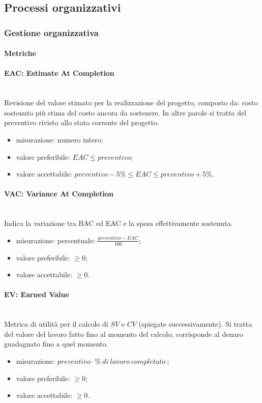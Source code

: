 \subsection{Processi organizzativi}
	\subsubsection{Gestione organizzativa}
\paragraph{Metriche}			
\paragraph*{EAC: Estimate At Completion}\mbox{}\\
Revisione del valore stimato per la realizzazione del progetto, composto da: costo sostenuto più stima del costo ancora da sostenere. In altre parole si tratta del preventivo rivisto allo stato corrente del progetto.
\begin{itemize}
	\item  misurazione: numero intero;
	\item  valore preferibile: $ EAC \leq preventivo$;
	\item  valore accettabile: $ preventivo -5\% \leq EAC \leq preventivo + 5\%$. 
\end{itemize}

\paragraph*{VAC: Variance At Completion}\mbox{}\\
Indica la variazione tra BAC ed EAC e la spesa effettivamente sostenuta.
\begin{itemize}
	\item  misurazione: percentuale: $\frac{preventivo - EAC}{100}$;
	\item  valore preferibile: $\geq 0$;
	\item  valore accettabile: $\geq 0$.
\end{itemize}

\paragraph*{EV: Earned Value}\mbox{}\\
Metrica di utilità per il calcolo di $SV$ e $CV$ (spiegate successivamente). Si tratta del valore del lavoro fatto fino al momento del calcolo; corrisponde al denaro guadagnato fino a quel momento.
\begin{itemize}
	\item  misurazione: $preventivo \cdot \%\ di\ lavoro\ completato\ $;
	\item  valore preferibile: $ \geq 0$;
	\item  valore accettabile: $ \geq 0$.
\end{itemize}

